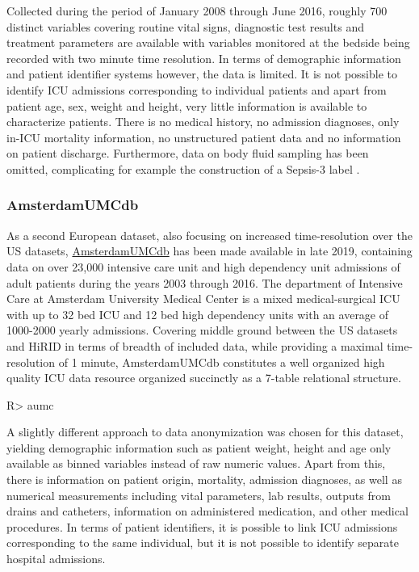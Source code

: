 \documentclass[
  notitle]{jss}
\begin{document}
Collected during the period of January 2008 through June 2016, roughly
700 distinct variables covering routine vital signs, diagnostic test
results and treatment parameters are available with variables monitored
at the bedside being recorded with two minute time resolution. In terms
of demographic information and patient identifier systems however, the
data is limited. It is not possible to identify ICU admissions
corresponding to individual patients and apart from patient age, sex,
weight and height, very little information is available to characterize
patients. There is no medical history, no admission diagnoses, only
in-ICU mortality information, no unstructured patient data and no
information on patient discharge. Furthermore, data on body fluid
sampling has been omitted, complicating for example the construction of
a Sepsis-3 label \citep{singer2016}.

\hypertarget{amsterdamumcdb}{%
\subsubsection{AmsterdamUMCdb}\label{amsterdamumcdb}}

As a second European dataset, also focusing on increased time-resolution
over the US datasets,
\href{https://amsterdammedicaldatascience.nl/\#amsterdamumcdb}{AmsterdamUMCdb}
has been made available in late 2019, containing data on over 23,000
intensive care unit and high dependency unit admissions of adult
patients during the years 2003 through 2016. The department of Intensive
Care at Amsterdam University Medical Center is a mixed medical-surgical
ICU with up to 32 bed ICU and 12 bed high dependency units with an
average of 1000-2000 yearly admissions. Covering middle ground between
the US datasets and HiRID in terms of breadth of included data, while
providing a maximal time-resolution of 1 minute, AmsterdamUMCdb
constitutes a well organized high quality ICU data resource organized
succinctly as a 7-table relational structure.

\begin{CodeChunk}
\begin{CodeInput}
R> aumc
\end{CodeInput}
\end{CodeChunk}

A slightly different approach to data anonymization was chosen for this
dataset, yielding demographic information such as patient weight, height
and age only available as binned variables instead of raw numeric
values. Apart from this, there is information on patient origin,
mortality, admission diagnoses, as well as numerical measurements
including vital parameters, lab results, outputs from drains and
catheters, information on administered medication, and other medical
procedures. In terms of patient identifiers, it is possible to link ICU
admissions corresponding to the same individual, but it is not possible
to identify separate hospital admissions.
\end{document}
